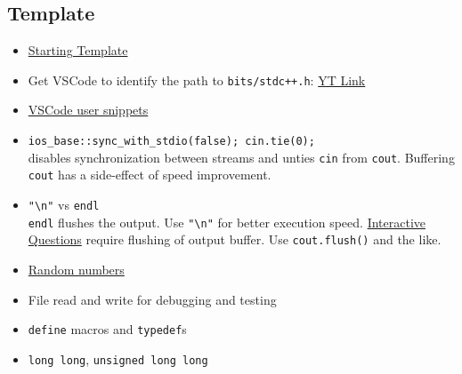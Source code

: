 \documentclass{article}
\begin{document}
\begin{sloppypar}
    \subsection{Template}
    \begin{itemize}
        \item \href{run:../programs/1_template.cpp}{Starting Template}
        \item Get VSCode to identify the path to \verb|bits/stdc++.h|: \href{https://www.youtube.com/watch?v=pyn0TjUnf18}{YT Link}
        \item \href{https://code.visualstudio.com/docs/editor/userdefinedsnippets}{VSCode user snippets}
        \item \verb|ios_base::sync_with_stdio(false); cin.tie(0);|\\
        disables synchronization between streams and unties \verb|cin| from \verb|cout|. Buffering \verb|cout| has a side-effect of speed improvement.
        \item \verb|"\n"| vs \verb|endl|\\
        \verb|endl| flushes the output. Use \verb|"\n"| for better execution speed. \href{https://codeforces.com/blog/entry/45307}{Interactive Questions} require flushing of output buffer. Use \verb|cout.flush()| and the like.
        \item \href{https://codeforces.com/blog/entry/61587}{Random numbers}
        \item File read and write for debugging and testing
        \item \verb|define| macros and \verb|typedef|s
        \item \verb|long long|, \verb|unsigned long long|
    \end{itemize}


\end{sloppypar}
\end{document}
